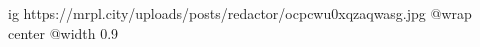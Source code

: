  
 
 
 
 

\ifcmt
  ig https://mrpl.city/uploads/posts/redactor/ocpcwu0xqzaqwasg.jpg
  @wrap center
  @width 0.9
\fi

